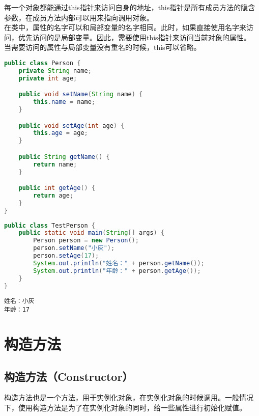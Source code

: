 每一个对象都能通过this指针来访问自身的地址，this指针是所有成员方法的隐含参数，在成员方法内部可以用来指向调用对象。 \\

在类中，属性的名字可以和局部变量的名字相同。此时，如果直接使用名字来访问，优先访问的是局部变量。因此，需要使用this指针来访问当前对象的属性。 \\

当需要访问的属性与局部变量没有重名的时候，this可以省略。 \\


\begin{lstlisting}[language=Java, title=Person.java]
public class Person {
    private String name;
    private int age;

    public void setName(String name) {
        this.name = name;
    }

    public void setAge(int age) {
        this.age = age;
    }

    public String getName() {
        return name;
    }

    public int getAge() {
        return age;
    }
}
\end{lstlisting}

\begin{lstlisting}[language=Java, title=TestPerson.java]
public class TestPerson {
    public static void main(String[] args) {
        Person person = new Person();
        person.setName("小灰");
        person.setAge(17);
        System.out.println("姓名：" + person.getName());
        System.out.println("年龄：" + person.getAge());
    }
}
\end{lstlisting}

\begin{tcolorbox}
	\begin{verbatim}
姓名：小灰
年龄：17
	\end{verbatim}
\end{tcolorbox}

\newpage

\section{构造方法}

\subsection{构造方法（Constructor）}

构造方法也是一个方法，用于实例化对象，在实例化对象的时候调用。一般情况下，使用构造方法是为了在实例化对象的同时，给一些属性进行初始化赋值。 \\

